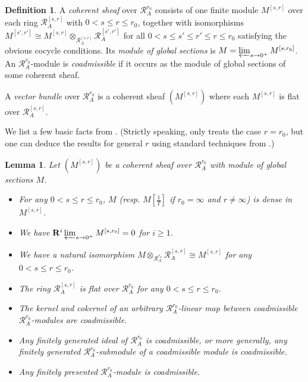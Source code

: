 \documentclass[12pt]{article}
\newtheorem{lemma}[theorem]{Lemma}
\theoremstyle{definition}
\newtheorem{defn}[theorem]{Definition}
\numberwithin{equation}{theorem}
\newcommand{\calR}{\mathcal{R}}
\newcommand{\bbR}{\mathbf{R}}
\begin{document}
\begin{defn}
A \emph{coherent sheaf} over $\calR_A^{r_0}$ consists of one finite  module $M^{[s,r]}$ over each ring $\calR_A^{[s,r]}$ with $0<s\leq r \leq r_0$, together with isomorphisms $M^{[s',r']}\cong M^{[s,r]} \otimes_{\calR_A^{[s,r]}} \calR_A^{[s',r']}$ for all $0< s \leq s' \leq r'\leq r \leq r_0$ satisfying the obvious cocycle conditions.  Its \emph{module of global sections} is $M = \varprojlim_{s \to 0^+} M^{[s,r_0]}$.  An $\calR_A^{r_0}$-module is \emph{coadmissible} if it occurs as the module of global sections of some coherent sheaf.

A \emph{vector bundle} over $\calR_A^{r_0}$ is a coherent sheaf $(M^{[s,r]})$ where each $M^{[s,r]}$ is flat over $\calR_A^{[s,r]}$.
\end{defn}

We list a few basic facts from \cite[Section~3]{schneider-teitelbaum}. (Strictly speaking, \cite[Section~3]{schneider-teitelbaum} only treats the case $r=r_0$, but one can deduce the results for general $r$ using standard techniques from \cite{BGR}.)

\begin{lemma}
\label{L:schneider-teitelbaum}
Let $(M^{[s,r]})$ be a coherent sheaf over $\calR_A^{r_0}$ with module of global sections $M$.
\begin{itemize}
\item[(1)] For any $0 < s\leq r \leq r_0$, $M$ (resp. $M[\frac 1T]$ if $r_0 =\infty$ and $r\neq \infty$) is dense in $M^{[s,r]}$.
\item[(2)] We have $\bbR^i\varprojlim_{s\to 0^+} M^{[s,r_0]} = 0$ for $i\geq 1$.
\item[(3)] We have a natural isomorphism $M \otimes_{\calR_A^{r_0}} \calR_A^{[s,r]} \cong M^{[s,r]}$ for any $0<s \leq r\leq r_0$.
\item[(4)] The ring $\calR_A^{[s,r]}$ is flat over $\calR_A^{r_0}$ for any $0<s \leq r\leq r_0$.
\item[(5)] The kernel and cokernel of an arbitrary $\calR_A^{r_0}$-linear map between coadmissible $\calR_A^{r_0}$-modules are coadmissible.
\item[(6)] Any finitely generated ideal of $\calR_A^{r_0}$ is coadmissible, or more generally, any finitely generated $\calR_A^{r_0}$-submodule of a coadmissible module is coadmissible.
\item[(7)] Any finitely presented $\calR_A^{r_0}$-module is coadmissible.
\end{itemize}

\end{lemma}
\end{document}
